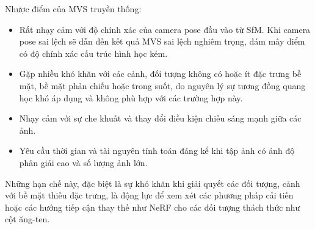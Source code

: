 Nhược điểm của MVS truyền thống:
\begin{itemize}
    \item Rất nhạy cảm với độ chính xác của camera pose đầu vào từ SfM. Khi camera pose sai lệch sẽ dẫn đến kết quả MVS sai lệch nghiêm trọng, đám mây điểm có độ chính xác cấu trúc hình học kém.
    \item Gặp nhiều khó khăn với các cảnh, đối tượng không có hoặc ít đặc trưng bề mặt, bề mặt phản chiếu hoặc trong suốt, do nguyên lý sự tương đồng quang học khó áp dụng và không phù hợp với các trường hợp này.
    \item Nhạy cảm với sự che khuất và thay đổi điều kiện chiếu sáng mạnh giữa các ảnh.
    \item Yêu cầu thời gian và tài nguyên tính toán đáng kể khi tập ảnh có ảnh độ phân giải cao và số lượng ảnh lớn.
\end{itemize}
Những hạn chế này, đặc biệt là sự khó khăn khi giải quyết các đối tượng, cảnh với bề mặt thiếu đặc trưng, là động lực để xem xét các phương pháp cải tiến hoặc các hướng tiếp cận thay thế như NeRF cho các đối tượng thách thức như cột ăng-ten.